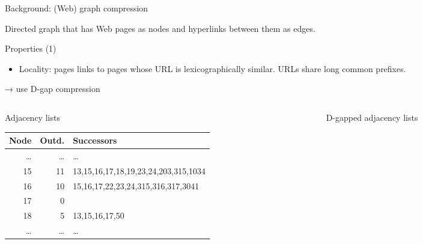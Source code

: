 \documentclass[aspectratio=169,xcolor=table]{beamer}
\begin{document}
    \begin{frame}{Background: (Web) graph compression}
        \begin{definition}
            Directed graph that has Web pages as nodes and hyperlinks between them as
            edges.
        \end{definition}
        \begin{block}{Properties (1)}
            \begin{itemize}
                \item \alert{\alert{Locality:}} pages links to pages whose URL is lexicographically
                    similar. URLs share long common prefixes.
            \end{itemize}

            → use \alert{D-gap compression}
        \end{block}
        \begin{columns}
            \begin{column}{0.5\columnwidth}
                \begin{block}{Adjacency lists}
                    \scriptsize
                    \begin{center}
                        \begin{tabular}{rrl}
                            \alert{Node} & \alert{Outd.} & \alert{Successors}\\
                            \hline
                            \ldots{} & \ldots{} & \ldots{}\\
                            15 & 11 & 13,15,16,17,18,19,23,24,203,315,1034\\
                            16 & 10 & 15,16,17,22,23,24,315,316,317,3041\\
                            17 & 0 & \\
                            18 & 5 & 13,15,16,17,50\\
                            \ldots{} & \ldots{} & \ldots{}\\
                        \end{tabular}
                    \end{center}
                \end{block}
            \end{column}
            \begin{column}{0.50\columnwidth}
                \begin{block}{D-gapped adjacency lists}
                    \scriptsize

\end{block}
\end{column}
\end{columns}
\end{frame}
\end{document}
